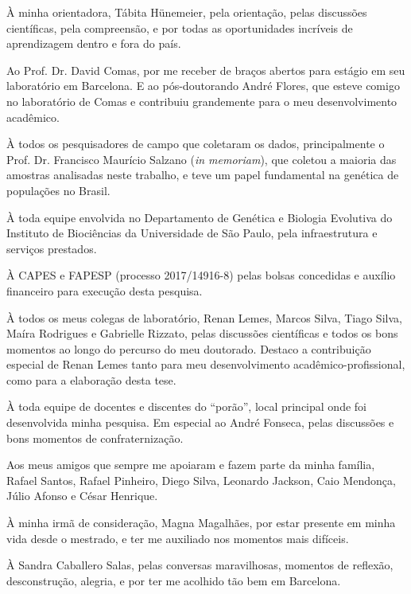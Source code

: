 \documentclass[12pt,openright,twoside,a4paper,sumario=tradicional,english,brazil]{abntex2}
\begin{document}
\begin{agradecimentos}

\setlength{\parindent}{1.5cm}  %
\setlength{\parskip}{5pt}      %

À minha orientadora, Tábita Hünemeier, pela orientação, pelas discussões científicas, pela compreensão, e por todas as oportunidades incríveis de aprendizagem dentro e fora do país.

Ao Prof. Dr. David Comas, por me receber de braços abertos para estágio em seu laboratório em Barcelona. E ao pós-doutorando André Flores, que esteve comigo no laboratório de Comas e contribuiu grandemente para o meu desenvolvimento acadêmico.

À todos os pesquisadores de campo que coletaram os dados, principalmente o Prof. Dr. Francisco Maurício Salzano (\emph{in memoriam}), que coletou a maioria das amostras analisadas neste trabalho, e teve um papel fundamental na genética de populações no Brasil.

À toda equipe envolvida no Departamento de Genética e Biologia Evolutiva do Instituto de Biociências da Universidade de São Paulo, pela infraestrutura e serviços prestados.

À CAPES e FAPESP (processo 2017/14916-8) pelas bolsas concedidas e auxílio financeiro para execução desta pesquisa.

À todos os meus colegas de laboratório, Renan Lemes, Marcos Silva, Tiago Silva, Maíra Rodrigues e Gabrielle Rizzato, pelas discussões científicas e todos os bons momentos ao longo do percurso do meu doutorado. Destaco a contribuição especial de Renan Lemes tanto para meu desenvolvimento acadêmico-profissional, como para a elaboração desta tese.

À toda equipe de docentes e discentes do “porão”, local principal onde foi desenvolvida minha pesquisa. Em especial ao André Fonseca, pelas discussões e bons momentos de confraternização.

Aos meus amigos que sempre me apoiaram e fazem parte da minha família, Rafael Santos, Rafael Pinheiro, Diego Silva, Leonardo Jackson, Caio Mendonça, Júlio Afonso e César Henrique.

À minha irmã de consideração, Magna Magalhães, por estar presente em minha vida desde o mestrado, e ter me auxiliado nos momentos mais difíceis.

À Sandra Caballero Salas, pelas conversas maravilhosas, momentos de reflexão, desconstrução, alegria, e por ter me acolhido tão bem em Barcelona.


\end{agradecimentos}
\end{document}
